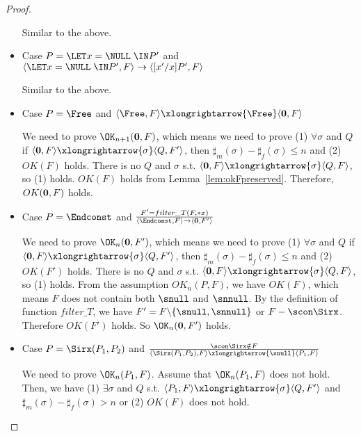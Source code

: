 \begin{proof}
\begin{itemize}
    Similar to the above.
  
\item Case \(P = \LET x = \NULL \; \IN P'\) and \( \langle \LET x = \NULL \;
  \IN P', F \rangle \rightarrow \langle [x'/x]P', F \rangle\)
  
    Similar to the above.
  
\item Case \(P = \Free\) and \(\langle \Free, F \rangle
  \xlongrightarrow{\Free} \langle {\bf 0}, F \rangle \)

  We need to prove \(\OK_{n+1}({\bf 0}, F)\), which means we need to
  prove (1) \( \forall \sigma \) and \(Q\) if \( \langle {\bf 0}, F
  \rangle \xlongrightarrow{\sigma} \langle Q, F' \rangle \), then
  \(\sharp_{m}(\sigma) - \sharp_{f}(\sigma) \le n\) and (2) \( OK(F)\)
  holds.  There is no \(Q\) and \(\sigma\) s.t. \(\langle {\bf 0}, F
  \rangle \xlongrightarrow{\sigma} \langle Q, F \rangle \), so (1)
  holds.  \(OK(F)\) holds from
  Lemma~\ref{lem:okFpreserved}. Therefore, \(OK({\bf 0}, F)\) holds.

\item Case \(P = \Endconst\) and \(\frac {F' = filter\_T(F, *x) }
  {\langle \Endconst, F \rangle \rightarrow \langle {\bf 0}, F' \rangle} \)

  We need to prove \(\OK_n({\bf 0}, F')\), which means we need to
  prove (1) \( \forall \sigma \) and \(Q\) if \( \langle {\bf 0}, F
  \rangle \xlongrightarrow{\sigma} \langle Q, F' \rangle \), then
  \(\sharp_{m}(\sigma) - \sharp_{f}(\sigma) \le n\) and (2) \(
  OK(F')\) holds.  There is no \(Q\) and \(\sigma\) s.t. \(\langle
  {\bf 0}, F \rangle \xlongrightarrow{\sigma} \langle Q, F \rangle \),
  so (1) holds.  From the assumption \(OK_n(P, F)\), we have
  \(OK(F)\), which means \(F\) does not contain both \(\snull\) and
  \(\snnull\). By the definition of function \(filter\_T\), we have
  \(F' = F\backslash\{\snull, \snnull\}\) or \(F - \scon\Sirx
  \). Therefore \(OK(F')\) holds. So \(\OK_n({\bf 0}, F')\) holds.
  
    
\item Case \( P = \Sirx(P_1,P_2) \) and \( \frac{ \scon\Sirx \notin F}
  { \langle \Sirx(P_1, P_2), F \rangle \xlongrightarrow{\snull} \langle P_1, F
    \rangle } \)

  We need to prove \(\OK_n(P_1, F)\).  Assume that \(\OK_n(P_1, F)\)
  does not hold. Then, we have (1) \( \exists \sigma \) and \(Q\)
  s.t. \( \langle P_1, F \rangle \xlongrightarrow{\sigma} \langle Q,
  F' \rangle \) and \(\sharp_{m}(\sigma) -
  \sharp_{f}(\sigma) > n\) or (2) \( OK(F)\) does not hold.


\end{itemize}
\end{proof}
